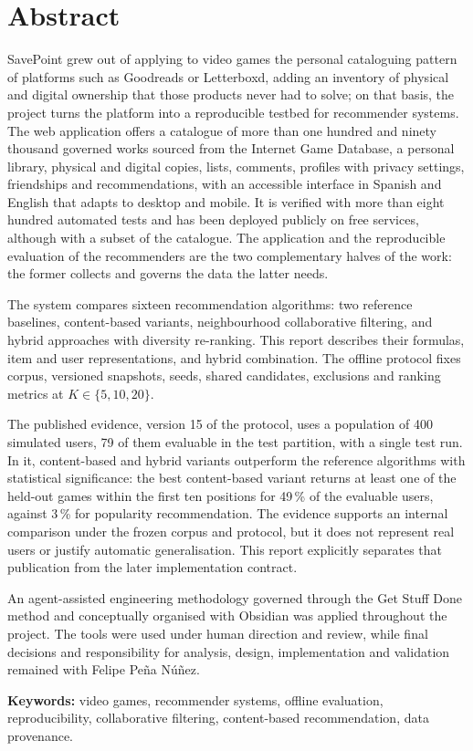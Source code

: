 \chapter*{Abstract}

SavePoint grew out of applying to video games the personal cataloguing pattern of platforms such as Goodreads or Letterboxd, adding an inventory of physical and digital ownership that those products never had to solve; on that basis, the project turns the platform into a reproducible testbed for recommender systems. The web application offers a catalogue of more than one hundred and ninety thousand governed works sourced from the Internet Game Database, a personal library, physical and digital copies, lists, comments, profiles with privacy settings, friendships and recommendations, with an accessible interface in Spanish and English that adapts to desktop and mobile. It is verified with more than eight hundred automated tests and has been deployed publicly on free services, although with a subset of the catalogue. The application and the reproducible evaluation of the recommenders are the two complementary halves of the work: the former collects and governs the data the latter needs.

The system compares sixteen recommendation algorithms: two reference baselines, content-based variants, neighbourhood collaborative filtering, and hybrid approaches with diversity re-ranking. This report describes their formulas, item and user representations, and hybrid combination. The offline protocol fixes corpus, versioned snapshots, seeds, shared candidates, exclusions and ranking metrics at $K\in\{5,10,20\}$.

The published evidence, version 15 of the protocol, uses a population of 400 simulated users, 79 of them evaluable in the test partition, with a single test run. In it, content-based and hybrid variants outperform the reference algorithms with statistical significance: the best content-based variant returns at least one of the held-out games within the first ten positions for 49\,\% of the evaluable users, against 3\,\% for popularity recommendation. The evidence supports an internal comparison under the frozen corpus and protocol, but it does not represent real users or justify automatic generalisation. This report explicitly separates that publication from the later implementation contract.

An agent-assisted engineering methodology governed through the Get Stuff Done method and conceptually organised with Obsidian was applied throughout the project. The tools were used under human direction and review, while final decisions and responsibility for analysis, design, implementation and validation remained with Felipe Peña Núñez.

\vspace{.5cm}
\textbf{Keywords:} video games, recommender systems, offline evaluation, reproducibility, collaborative filtering, content-based recommendation, data provenance.
